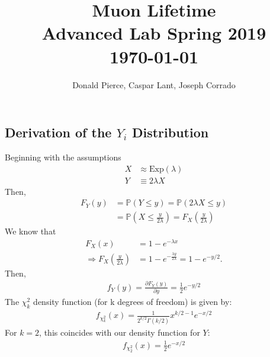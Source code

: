 

\graphicspath{{img/}}

\title{Muon Lifetime \\ \small Advanced Lab Spring 2019 \\ \today}
\vspace{-.5cm}
\author{Donald Pierce, Caspar Lant, Joseph Corrado}

\begin{multicols}{2}






%




\appendix
\section{Derivation of the $Y_i$ Distribution}
Beginning with the assumptions
\begin{align}
        X &\approx \textrm{Exp}(\lambda) \\
        Y &\equiv 2\lambda X
\end{align}
Then, 
\begin{align}
        F_Y(y) &= \mathbb{P}(Y\leq y)=\mathbb{P}(2\lambda X\leq y) \\
        & = \mathbb{P}\left(X\leq\frac{y}{2\lambda}\right)=F_X\left(\frac{y}{2\lambda}\right)
\end{align}
We know that 
\begin{align}
        F_X(x) &= 1-e^{-\lambda x} \\
        \Rightarrow F_X(\frac{y}{2\lambda}) &= 1-e^{-\frac{\lambda y}{2\lambda}}=1-e^{-y/2}. 
\end{align}
Then, 
\begin{align}
        f_Y(y)=\frac{\partial F_Y(y)}{\partial y}=\frac{1}{2}e^{-y/2}
\end{align}
The $\chi_k^2$ density function (for k degrees of freedom) is given by:
\begin{align}
        f_{\chi_k^2}(x)=\frac{1}{2^{k/2}\Gamma(k/2)}x^{k/2-1}e^{-x/2}
\end{align}
For $k=2$, this coincides with our density function for $Y$:
\begin{align}
        f_{\chi_2^2}(x)=\frac{1}{2}e^{-x/2}
\end{align}

\end{multicols}



